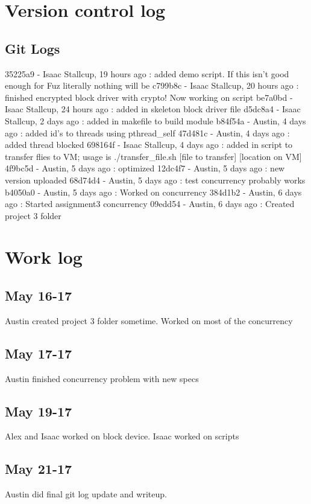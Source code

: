 \documentclass[letterpaper,10pt,titlepage]{article}
\begin{document}
\section{Version control log}
\subsection{Git Logs}
35225a9 - Isaac Stallcup, 19 hours ago : added demo script. If this isn't good enough for Fuz literally nothing will be
c799b8c - Isaac Stallcup, 20 hours ago : finished encrypted block driver with crypto! Now working on script
be7a0bd - Isaac Stallcup, 24 hours ago : added in skeleton block driver file
d5dc8a4 - Isaac Stallcup, 2 days ago : added in makefile to build module
b84f54a - Austin, 4 days ago : added id's to threads using pthread_self
47d481c - Austin, 4 days ago : added thread blocked
698164f - Isaac Stallcup, 4 days ago : added in script to transfer flies to VM; usage is ./transfer_file.sh [file to transfer] [location on VM]
4f9bc5d - Austin, 5 days ago : optimized
12dc4f7 - Austin, 5 days ago : new version uploaded
68d74d4 - Austin, 5 days ago : test concurrency probably works
b4050a0 - Austin, 5 days ago : Worked on concurrency
384d1b2 - Austin, 6 days ago : Started assignment3 concurrency
09edd54 - Austin, 6 days ago : Created project 3 folder
\section{Work log}

\subsection{May 16-17}
Austin created project 3 folder sometime.  Worked on most of the concurrency
\subsection{May 17-17}
Austin finished concurrency problem with new specs
\subsection{May 19-17}
Alex and Isaac worked on block device. Isaac worked on scripts
\subsection{May 21-17}
Austin did final git log update and writeup.

%
%
\end{document}
